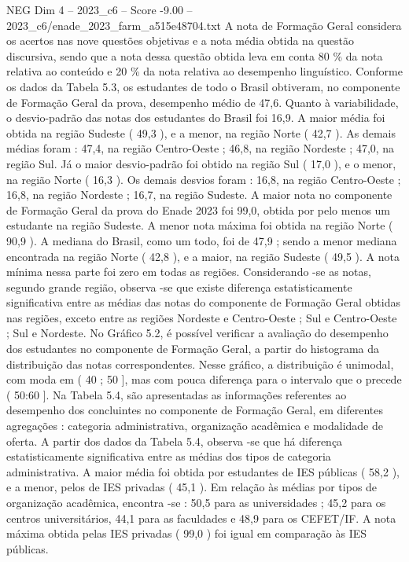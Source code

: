 \begin{textsample}{NEG Dim 4 – 2023\_c6 – Score -9.00 – 2023\_c6/enade\_2023\_farm\_a515e48704.txt}
A nota de Formação Geral considera os acertos nas nove questões objetivas e a nota média obtida na questão discursiva, sendo que a nota dessa questão obtida leva em conta 80 \% da nota relativa ao conteúdo e 20 \% da nota relativa ao desempenho linguístico.
Conforme os dados da Tabela 5.3, os estudantes de todo o Brasil obtiveram, no componente de Formação Geral da prova, desempenho médio de 47,6.
Quanto à variabilidade, o desvio-padrão das notas dos estudantes do Brasil foi 16,9.
A maior média foi obtida na região Sudeste ( 49,3 ), e a menor, na região Norte ( 42,7 ).
As demais médias foram : 47,4, na região Centro-Oeste ; 46,8, na região Nordeste ; 47,0, na região Sul.
Já o maior desvio-padrão foi obtido na região Sul ( 17,0 ), e o menor, na região Norte ( 16,3 ).
Os demais desvios foram : 16,8, na região Centro-Oeste ; 16,8, na região Nordeste ; 16,7, na região Sudeste.
A maior nota no componente de Formação Geral da prova do Enade 2023 foi 99,0, obtida por pelo menos um estudante na região Sudeste.
A menor nota máxima foi obtida na região Norte ( 90,9 ).
A mediana do Brasil, como um todo, foi de 47,9 ; sendo a menor mediana encontrada na região Norte ( 42,8 ), e a maior, na região Sudeste ( 49,5 ).
A nota mínima nessa parte foi zero em todas as regiões.
Considerando -se as notas, segundo grande região, observa -se que existe diferença estatisticamente significativa entre as médias das notas do componente de Formação Geral obtidas nas regiões, exceto entre as regiões Nordeste e Centro-Oeste ; Sul e Centro-Oeste ; Sul e Nordeste.
No Gráfico 5.2, é possível verificar a avaliação do desempenho dos estudantes no componente de Formação Geral, a partir do histograma da distribuição das notas correspondentes.
Nesse gráfico, a distribuição é unimodal, com moda em ( 40 ; 50 ], mas com pouca diferença para o intervalo que o precede ( 50:60 ].
Na Tabela 5.4, são apresentadas as informações referentes ao desempenho dos concluintes no componente de Formação Geral, em diferentes agregações : categoria administrativa, organização acadêmica e modalidade de oferta.
A partir dos dados da Tabela 5.4, observa -se que há diferença estatisticamente significativa entre as médias dos tipos de categoria administrativa.
A maior média foi obtida por estudantes de IES públicas ( 58,2 ), e a menor, pelos de IES privadas ( 45,1 ).
Em relação às médias por tipos de organização acadêmica, encontra -se : 50,5 para as universidades ; 45,2 para os centros universitários, 44,1 para as faculdades e 48,9 para os CEFET/IF.
A nota máxima obtida pelas IES privadas ( 99,0 ) foi igual em comparação às IES públicas.

\end{textsample}
